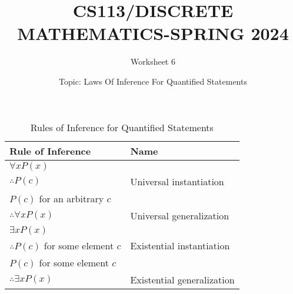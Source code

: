 \documentclass{exam}
\title{CS113/DISCRETE MATHEMATICS-SPRING 2024}
\author{Worksheet 6}
\date{Topic: Laws Of Inference For Quantified Statements}
\begin{document}
\maketitle

\begin{center}
\end{center}

\vspace{5mm}

\vspace{5mm}


\vspace{5mm}
\begin{center}
\begin{table}[htbp]
\centering
\caption{Rules of Inference for Quantified Statements}
\begin{tabular}{|l|l|}
\hline
Rule of Inference & Name \\
\hline
$\forall x P(x)$ & \\
$\therefore P(c)$ & Universal instantiation \\
\hline
$P(c)$ for an arbitrary $c$ & \\
$\therefore \forall x P(x)$ & Universal generalization \\
\hline
$\exists x P(x)$ & \\
$\therefore P(c)$ for some element $c$ & Existential instantiation \\
\hline
$P(c)$ for some element $c$ & \\
$\therefore \exists x P(x)$ & Existential generalization \\
\hline
\end{tabular}
\end{table}

\end{center}
\vspace{1.5in}
\end{document}
